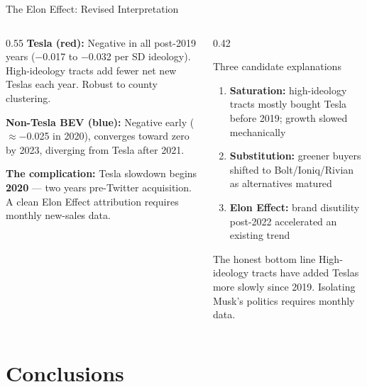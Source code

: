 \documentclass[aspectratio=169,t]{beamer}
\begin{document}
\begin{frame}{The Elon Effect: Revised Interpretation}
  \begin{columns}[T]
    \begin{column}{0.55\textwidth}
      \small
      \textbf{\textcolor{elonred}{Tesla (red):}} Negative in all post-2019 years
      ($-$0.017 to $-$0.032 per SD ideology).
      High-ideology tracts add fewer net new Teslas each year. Robust to county clustering.

      \vspace{0.15em}
      \textbf{\textcolor{evblue}{Non-Tesla BEV (blue):}} Negative early
      ($\approx$$-$0.025 in 2020), converges toward zero by 2023,
      diverging from Tesla after 2021.

      \vspace{0.15em}
      \textbf{The complication:} Tesla slowdown begins \textbf{2020} ---
      two years pre-Twitter acquisition. A clean Elon Effect attribution
      requires monthly new-sales data.
    \end{column}
    \begin{column}{0.42\textwidth}
      \begin{block}{Three candidate explanations}
        \begin{enumerate}\small
          \item \textbf{Saturation:} high-ideology tracts mostly bought
                Tesla before 2019; growth slowed mechanically
          \item \textbf{Substitution:} greener buyers shifted to
                Bolt/Ioniq/Rivian as alternatives matured
          \item \textbf{Elon Effect:} brand disutility post-2022
                accelerated an existing trend
        \end{enumerate}
      \end{block}
      \vspace{0.05em}
      \begin{alertblock}{The honest bottom line}
        \small High-ideology tracts have added Teslas more slowly
        since 2019. Isolating Musk's politics requires monthly data.
      \end{alertblock}
    \end{column}
  \end{columns}
\end{frame}

\section{Conclusions}
\end{document}
